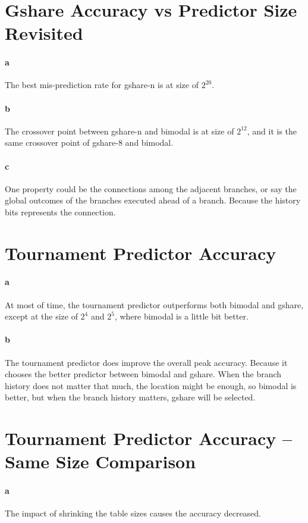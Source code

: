 \documentclass[12pt,letterpaper]{article}
\begin{document}
\section{Gshare Accuracy vs Predictor Size Revisited}
\paragraph*{a}
The best mis-prediction rate for gshare-n is at size of $2^{20}$.

\paragraph*{b}
The crossover point between gshare-n and bimodal is at size of $2^{12}$, 
and it is the same crossover point of gshare-8 and bimodal.

\paragraph*{c}
One property could be the connections among the adjacent branches, or say 
the global outcomes of the branches executed ahead of a branch. Because the
history bits represents the connection.

\section{Tournament Predictor Accuracy}
\paragraph*{a}
At most of time, the tournament predictor outperforms both bimodal and 
gshare, except at the size of $2^4$ and $2^5$, where bimodal is a little bit
better.

\paragraph*{b}
The tournament predictor does improve the overall peak accuracy. Because
it chooses the better predictor between bimodal and gshare. When the branch
history does not matter that much, the location might be enough, so bimodal
is better, but when the branch history matters, gshare will be selected.

\section{Tournament Predictor Accuracy -- Same Size Comparison}
\paragraph*{a}
The impact of shrinking the table sizes causes the accuracy decreased.
\end{document}
